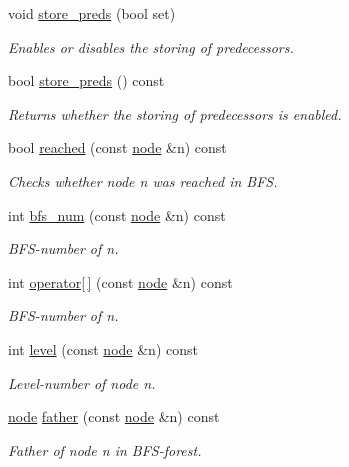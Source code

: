 \begin{DoxyCompactItemize}
void \mbox{\hyperlink{classbfs_a8c7ce0ea2cd8e1932d1da5693d90cf61}{store\+\_\+preds}} (bool set)
\begin{DoxyCompactList}\small\item\em Enables or disables the storing of predecessors. \end{DoxyCompactList}\item 
bool \mbox{\hyperlink{classbfs_ac4373b51885382f6f1a9312c1b0923bd}{store\+\_\+preds}} () const
\begin{DoxyCompactList}\small\item\em Returns whether the storing of predecessors is enabled. \end{DoxyCompactList}\item 
bool \mbox{\hyperlink{classbfs_ab1a7882a7d56e0e72bbe1a344381bdae}{reached}} (const \mbox{\hyperlink{classnode}{node}} \&n) const
\begin{DoxyCompactList}\small\item\em Checks whether node {\itshape n} was reached in B\+FS. \end{DoxyCompactList}\item 
int \mbox{\hyperlink{classbfs_a6205cc191bc0bedf1ff9d74af0925735}{bfs\+\_\+num}} (const \mbox{\hyperlink{classnode}{node}} \&n) const
\begin{DoxyCompactList}\small\item\em B\+F\+S-\/number of {\itshape n}. \end{DoxyCompactList}\item 
int \mbox{\hyperlink{classbfs_addc2a3d0a275007455d22f6b76830e66}{operator\mbox{[}$\,$\mbox{]}}} (const \mbox{\hyperlink{classnode}{node}} \&n) const
\begin{DoxyCompactList}\small\item\em B\+F\+S-\/number of {\itshape n}. \end{DoxyCompactList}\item 
int \mbox{\hyperlink{classbfs_ac0158a0453fb17a89be4049d21db56b1}{level}} (const \mbox{\hyperlink{classnode}{node}} \&n) const
\begin{DoxyCompactList}\small\item\em Level-\/number of node {\itshape n}. \end{DoxyCompactList}\item 
\mbox{\hyperlink{classnode}{node}} \mbox{\hyperlink{classbfs_a3e1a7b0e4bde586d0be44616e533c59c}{father}} (const \mbox{\hyperlink{classnode}{node}} \&n) const
\begin{DoxyCompactList}\small\item\em Father of node {\itshape n} in B\+F\+S-\/forest. \end{DoxyCompactList}\item 

\end{DoxyCompactItemize}
